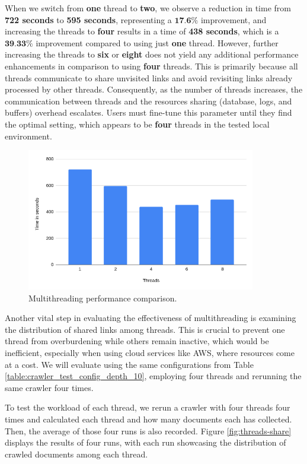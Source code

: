 {When we switch from \textbf{one} thread to \textbf{two}, we observe a reduction in time from \textbf{722 seconds} to \textbf{595 seconds}, representing a $\textbf{17.6\%}$ improvement, and increasing the threads to \textbf{four} results in a time of \textbf{438 seconds}, which is a $\textbf{39.33\%}$ improvement compared to using just \textbf{one} thread. However, further increasing the threads to \textbf{six} or \textbf{eight} does not yield any additional performance enhancements in comparison to using \textbf{four} threads. This is primarily because all threads communicate to share unvisited links and avoid revisiting links already processed by other threads. Consequently, as the number of threads increases, the communication between threads and the resources sharing (database, logs, and buffers) overhead escalates.
Users must fine-tune this parameter until they find the optimal setting, which appears to be \textbf{four} threads in the tested local environment.

\begin{figure}[H]	
     \centering
     \includegraphics[width=10cm]{figures/threads-table.png}
     \captionsetup{justification=centering,margin=2cm}
     \caption{Multithreading performance comparison. }
     \label{fig:threads-table}
\end{figure}


Another vital step in evaluating the effectiveness of multithreading is examining the distribution of shared links among threads. This is crucial to prevent one thread from overburdening while others remain inactive, which would be inefficient, especially when using cloud services like AWS, where resources come at a cost. We will evaluate using the same configurations from Table \ref{table:crawler_test_config_depth_10}, employing four threads and rerunning the same crawler four times.

To test the workload of each thread, we rerun a crawler with four threads four times and calculated each thread and how many documents each has collected. Then, the average of those four runs is also recorded. Figure \ref{fig:threads-share} displays the results of four runs, with each run showcasing the distribution of crawled documents among each thread. 

}
